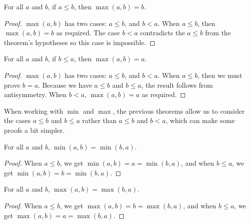 \documentclass[../math.tex]{subfiles}
\begin{document}
\begin{theorem}
    For all $a$ and $b$, if $a \leq b$, then $\max(a, b) = b$.
\end{theorem}
\begin{proof}
    $\max(a, b)$ has two cases: $a \leq b$, and $b < a$.  When $a \leq b$, then
    $\max(a, b) = b$ as required.  The case $b < a$ contradicts the $a \leq b$
    from the theorem's hypotheses so this case is impossible.
\end{proof}

\begin{theorem}
    For all $a$ and $b$, if $b \leq a$, then $\max(a, b) = a$.
\end{theorem}
\begin{proof}
    $\max(a, b)$ has two cases: $a \leq b$, and $b < a$.  When $a \leq b$, then
    we must prove $b = a$.  Because we have $a \leq b$ and $b \leq a$, the
    result follows from antisymmetry.  When $b < a$, $\max(a, b) = a$ as
    required.
\end{proof}

When working with $\min$ and $\max$, the previous theorems allow us to consider
the cases $a \leq b$ and $b \leq a$ rather than $a \leq b$ and $b < a$, which
can make some proofs a bit simpler.

\begin{theorem} \label{min_comm}
    For all $a$ and $b$, $\min(a, b) = \min(b, a)$.
\end{theorem}
\begin{proof}
    When $a \leq b$, we get $\min(a, b) = a = \min(b, a)$, and when $b \leq a$,
    we get $\min(a, b) = b = \min(b, a)$.
\end{proof}

\begin{theorem} \label{max_comm}
    For all $a$ and $b$, $\max(a, b) = \max(b, a)$.
\end{theorem}
\begin{proof}
    When $a \leq b$, we get $\max(a, b) = b = \max(b, a)$, and when $b \leq a$,
    we get $\max(a, b) = a = \max(b, a)$.
\end{proof}
\end{document}
